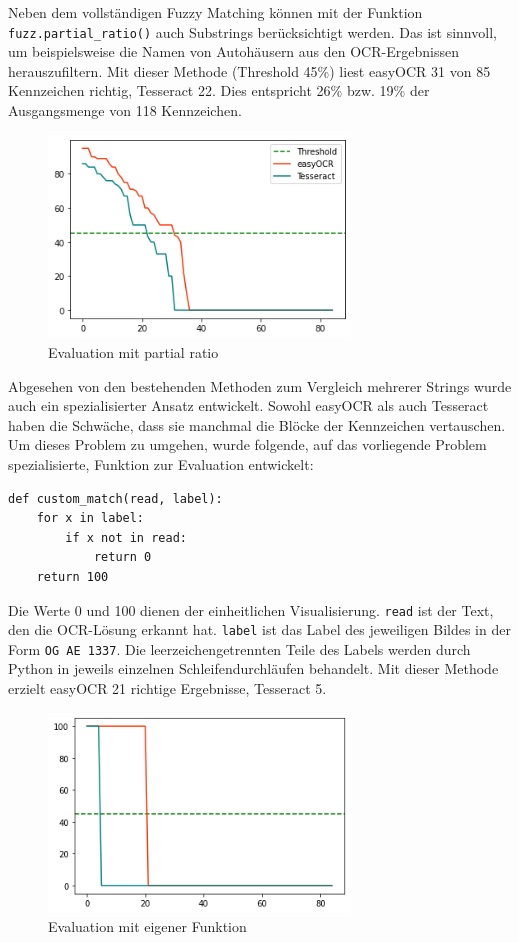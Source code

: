 Neben dem vollständigen Fuzzy Matching können mit der Funktion \lstinline{fuzz.partial_ratio()} auch Substrings berücksichtigt werden.
Das ist sinnvoll, um beispielsweise die Namen von Autohäusern aus den OCR-Ergebnissen herauszufiltern.
Mit dieser Methode (Threshold 45\%) liest easyOCR 31 von 85 Kennzeichen richtig, Tesseract 22. Dies entspricht 26\% bzw. 19\% der Ausgangsmenge von 118 Kennzeichen.
\begin{figure}[H]
		\centering
\includegraphics[width=8cm]{./img/evaluation_partial_ratio.png}
\caption{Evaluation mit partial ratio}
\end{figure}


Abgesehen von den bestehenden Methoden zum Vergleich mehrerer Strings wurde auch ein spezialisierter Ansatz entwickelt. Sowohl easyOCR als auch Tesseract haben die Schwäche, dass sie manchmal die Blöcke der Kennzeichen vertauschen. Um dieses Problem zu umgehen, wurde folgende, auf das vorliegende Problem spezialisierte, Funktion zur Evaluation entwickelt:

\begin{lstlisting} 
def custom_match(read, label):	
	for x in label:
		if x not in read:
			return 0
	return 100
\end{lstlisting}     
Die Werte 0 und 100 dienen der einheitlichen Visualisierung. \lstinline{read} ist der Text, den die OCR-Lösung erkannt hat. \lstinline{label} ist das Label des jeweiligen Bildes in der Form \lstinline{OG AE 1337}. Die leerzeichengetrennten Teile des Labels werden durch Python in jeweils einzelnen Schleifendurchläufen behandelt.
Mit dieser Methode erzielt easyOCR 21 richtige Ergebnisse, Tesseract 5.
\begin{figure}[H]
		\centering
	\includegraphics[width=8cm]{./img/evaluation_custom_matcher.png}
	\caption{Evaluation mit eigener Funktion}
\end{figure}


